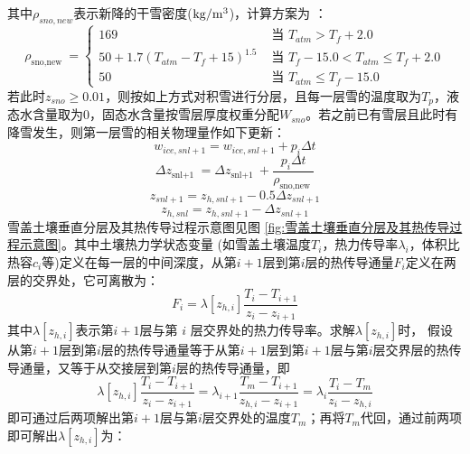 其中$\rho_{sno,new}$表示新降的干雪密度($\rm kg/m^3$)，计算方案为 \citet{anderson1976point}：
\begin{equation}
\rho_{\text {sno,new }}=\left\{\begin{array}{lr}169 & \text { 当 } T_{a t m}>T_{f}+2.0 \\ 50+1.7\left(T_{a t m}-T_{f}+15\right)^{1.5} & \text { 当 } T_{f}-15.0<T_{a t m} \leq T_{f}+2.0 \\ 50 & \text { 当 } T_{a t m} \leq T_{f}-15.0\end{array}\right.
\end{equation}
若此时$z_{sno} \geq 0.01$，则按如上方式对积雪进行分层，且每一层雪的温度取为$T_p$，液态水含量取为0，固态水含量按雪层厚度权重分配$W_{sno}$。若之前已有雪层且此时有降雪发生，则第一层雪的相关物理量作如下更新：
\begin{equation}
w_{ice, s n l+1}=w_{ice, s n l+1}+p_{i} \Delta t
\end{equation}
\begin{equation}
\Delta z_{\text {snl+1 }}=\Delta z_{\text {snl+1 }}+\frac{p_{i} \Delta t}{\rho_{\text {sno,new }}}
\end{equation}
\begin{equation}
z_{s n l+1}=z_{h, s n l+1}-0.5 \Delta z_{s n l+1}
\end{equation}
\begin{equation}
z_{h, s n l}=z_{h, s n l+1}-\Delta z_{s n l+1}
\end{equation}
雪盖土壤垂直分层及其热传导过程示意图见图 \ref{fig:雪盖土壤垂直分层及其热传导过程示意图}。其中土壤热力学状态变量
(如雪盖土壤温度$T_i$，热力传导率$\lambda_i$，体积比热容$c_i$等)定义在每一层的中间深度，从第$i+1$层到第$ i $层的热传导通量$F_i$定义在两层的交界处，它可离散为：
\begin{equation}
F_{i}=\lambda\left[z_{h, i}\right] \frac{T_{i}-T_{i+1}}{z_{i}-z_{i+1}}
\end{equation}
其中$\lambda\left[z_{h,i}\right]$表示第$i+1$层与第 $i$ 层交界处的热力传导率。求解$\lambda\left[z_{h,i}\right]$时，
假设从第$i+1$层到第$ i $层的热传导通量等于从第$i+1$层到第$i+1$层与第$i$层交界层的热传导通量，又等于从交接层到第$i$层的热传导通量，即
\begin{equation}
\lambda\left[z_{h, i}\right] \frac{T_{i}-T_{i+1}}{z_{i}-z_{i+1}}=\lambda_{i+1} \frac{T_{m}-T_{i+1}}{z_{h, i}-z_{i+1}}=\lambda_{i} \frac{T_{i}-T_{m}}{z_{i}-z_{h, i}}
\end{equation}
即可通过后两项解出第$i+1$层与第$i$层交界处的温度$T_m$；再将$T_m$代回，通过前两项即可解出$\lambda\left[z_{h,i}\right]$为：
